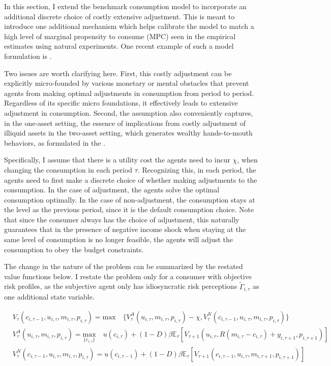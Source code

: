 In this section, I extend the benchmark consumption model to incorporate an additional discrete choice of costly extensive adjustment. This is meant to introduce one additional mechanism which helps calibrate the model to match a high level of marginal propensity to consume (MPC) seen in the empirical estimates using natural experiments. One recent example of such a model formulation is \cite{fuster2021would}. 

Two issues are worth clarifying here. First, this costly adjustment can be explicitly micro-founded by various monetary or mental obstacles that prevent agents from making optimal adjustments in consumption from period to period. Regardless of its specific micro foundations, it effectively leads to extensive adjustment in consumption. Second, the assumption also conveniently captures, in the one-asset setting, the essence of implications from costly adjustment of illiquid assets in the two-asset setting, which generates wealthy hands-to-mouth behaviors, as formulated in the \citep{kaplan2014model}. 


Specifically, I assume that there is a utility cost the agents need to incur $\chi$, when changing the consumption in each period $\tau$. Recognizing this, in each period, the agents need to first make a discrete choice of whether making adjustments to the consumption. In the case of adjustment, the agents solve the optimal consumption optimally. In the case of non-adjustment, the consumption stays at the level as the previous period, since it is the default consumption choice. Note that since the consumer always has the choice of adjustment, this naturally guarantees that in the presence of negative income shock when staying at the same level of consumption is no longer feasible, the agents will adjust the consumption to obey the budget constraints. 

The change in the nature of the problem can be summarized by the restated value functions below. I restate the problem only for a consumer with objective risk profiles, as the subjective agent only has idiosyncratic risk perceptions $\tilde \Gamma_{i,\tau}$ as one additional state variable. 

\begin{equation}
\begin{split}
& V_{\tau}(c_{i,\tau-1},u_{i,\tau}, m_{i,\tau}, p_{i,\tau}) = \textrm{max} \quad \{V^A_{\tau}(u_{i,\tau}, m_{i,\tau}, p_{i,\tau})-\chi,V^N_{\tau}(c_{i,\tau-1},u_{i,\tau}, m_{i,\tau}, p_{i,\tau})\} \\
& V^A_{\tau}(u_{i,\tau}, m_{i,\tau}, p_{i,\tau}) = \underset{\{c_{i,\tau}\}}{\textrm{max}} \quad u(c_{i,\tau}) + (1-D)\beta \mathbb{E}_{\tau}\left[V_{\tau+1}(u_{i,\tau},R(m_{i,\tau}-c_{i,\tau})+y_{i,\tau+1}, p_{i,\tau+1})\right]  \\
& V^N_{\tau}(c_{i,\tau-1},u_{i,\tau}, m_{i,\tau}, p_{i,\tau}) =  u(c_{i,\tau-1}) + (1-D)\beta \mathbb{E}_{\tau}\left[V_{\tau+1}(c_{i,\tau-1},u_{i,\tau},m_{i,\tau+1}, p_{i,\tau+1})\right]
\end{split}
\end{equation}

